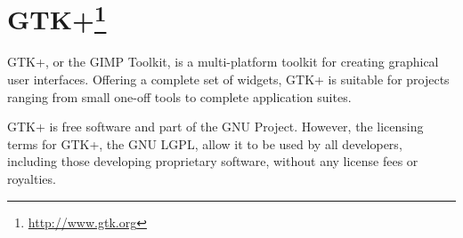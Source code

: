 
\section[GTK+]{GTK+\footnote{\url{http://www.gtk.org}}}\label{Gtk}


GTK+, or the GIMP Toolkit, is a multi-platform toolkit for creating graphical user interfaces. Offering a complete set of widgets, GTK+ is suitable for projects ranging from small one-off tools to complete application suites.

GTK+ is free software and part of the GNU Project. However, the licensing terms for GTK+, the GNU LGPL, allow it to be used by all developers, including those developing proprietary software, without any license fees or royalties.

